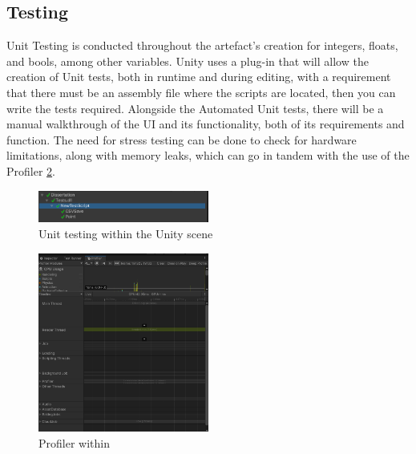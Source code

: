 \documentclass[conference]{IEEEtran}
\begin{document}
\subsection{Testing}
Unit Testing is conducted throughout the artefact's creation for integers, floats, and bools, among other variables. Unity uses a plug-in that will allow the creation of Unit tests, both in runtime and during editing, with a requirement that there must be an assembly file where the scripts are located, then you can write the tests required. Alongside the Automated Unit tests, there will be a manual walkthrough of the UI and its functionality, both of its requirements and function. The need for stress testing can be done to check for hardware limitations, along with memory leaks, which can go in tandem with the use of the Profiler \ref{tab:Profiler}.
\begin{figure}[H]
\begin{center}
\includegraphics[width = 0.5\textwidth, ]{Unittesting}
\caption{Unit testing within the Unity scene}
\label{tab:figure3}
\end{center}
\end{figure}

\begin{figure}[H]
\begin{center}
\includegraphics[width = 0.5\textwidth, ]{Profiler}
\caption{Profiler within}
\label{tab:Profiler}
\end{center}
\end{figure}
\end{document}
